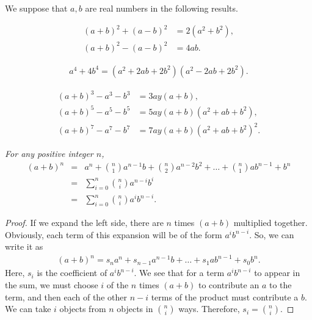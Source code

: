 
	We suppose that $a,b$ are real numbers in the following results.
	
	\begin{identity}\label{id:diffsqr}
		\begin{align*}
			(a+b)^2+(a-b)^2 &= 2(a^2+b^2),\\
			(a+b)^2-(a-b)^2 & = 4ab.
		\end{align*}
	\end{identity}
	
	\begin{identity}\slshape
		\begin{align*}
			a^4+4b^4=(a^2+2ab+2b^2)(a^2-2ab+2b^2).
		\end{align*}
	\end{identity}
	
	\begin{identity}
		\begin{align*}
			(a+b)^3 - a^3 - b^3 &= 3ay(a+b),\\
			(a+b)^5 - a^5 - b^5 &= 5ay(a+b)(a^2+ab+b^2),\\
			(a+b)^7 - a^7 - b^7 &= 7ay(a+b)(a^2+ab+b^2)^2.
		\end{align*}
	\end{identity}
	
	\begin{theorem}\slshape\label{thm:binomial-theorem}
		For any positive integer $n$,
		\begin{eqnarray*}
			(a+b)^n & = & a^n+\binom{n}{1}a^{n-1}b+\binom{n}{2}a^{n-2}b^2+\dots+\binom{n}{1}ab^{n-1}+b^n\\
			& = & \sum_{i=0}^{n}\binom{n}{i}a^{n-i}b^i\\
			& = & \sum_{i=0}^{n}\binom{n}{i}a^ib^{n-i}.
		\end{eqnarray*}
	\end{theorem}
	
	\begin{proof}
		If we expand the left side, there are $n$ times $(a+b)$ multiplied together. Obviously, each term of this expansion will be of the form $a^ib^{n-i}$. So, we can write it as
		\begin{align*}
			(a+b)^n=s_na^n+s_{n-1}a^{n-1}b+\dots+s_1ab^{n-1}+s_0b^n.
		\end{align*}
		Here, $s_i$ is the coefficient of $a^ib^{n-i}$. We see that for a term $a^ib^{n-i}$ to appear in the sum, we must choose $i$ of the $n$ times $(a+b)$ to contribute an $a$ to the term, and then each of the other $n-i$ terms of the product must contribute a $b$. We can take $i$ objects from $n$ objects in $\binom{n}{i}$ ways. Therefore, $s_i=\binom{n}{i}$.
	\end{proof}
	
